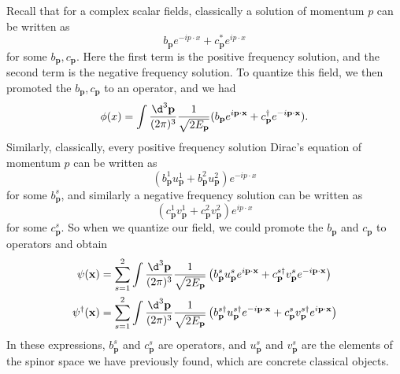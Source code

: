 \documentclass[a4paper]{article}
\begin{document}
Recall that for a complex scalar fields, classically a solution of momentum $p$ can be written as
\[
  b_\mathbf{p} e^{-ip\cdot x} + c_\mathbf{p}^* e^{ip\cdot x}
\]
for some $b_\mathbf{p}, c_\mathbf{p}$. Here the first term is the positive frequency solution, and the second term is the negative frequency solution. To quantize this field, we then promoted the $b_\mathbf{p}, c_\mathbf{p}$ to an operator, and we had
\[
  \phi(x) = \int \frac{\d^3 \mathbf{p}}{(2\pi)^3} \frac{1}{\sqrt{2E_\mathbf{p}}} (b_\mathbf{p} e^{i\mathbf{p}\cdot \mathbf{x}} + c_\mathbf{p}^\dagger e^{-i\mathbf{p}\cdot \mathbf{x}}).
\]
Similarly, classically, every positive frequency solution Dirac's equation of momentum $p$ can be written as
\[
  (b_\mathbf{p}^1 u_\mathbf{p}^1 + b_\mathbf{p}^2 u_\mathbf{p}^2)e^{-ip\cdot x}
\]
for some $b_\mathbf{p}^s$, and similarly a negative frequency solution can be written as
\[
  (c_\mathbf{p}^1 v_\mathbf{p}^1 + c_\mathbf{p}^2 v_\mathbf{p}^2) e^{ip\cdot x}
\]
for some $c_\mathbf{p}^s$. So when we quantize our field, we could promote the $b_\mathbf{p}$ and $c_\mathbf{p}$ to operators and obtain
\begin{align*}
  \psi(\mathbf{x}) &= \sum_{s = 1}^2 \int \frac{\d^3 \mathbf{p}}{(2\pi)^3} \frac{1}{\sqrt{2 E_\mathbf{p}}} \left(b_\mathbf{p}^s u_\mathbf{p}^s e^{i\mathbf{p}\cdot \mathbf{x}} + c_\mathbf{p}^{s\dagger}v_\mathbf{p}^s e^{-i\mathbf{p}\cdot \mathbf{x}}\right)\\
  \psi^\dagger (\mathbf{x}) &= \sum_{s = 1}^2 \int \frac{\d^3 \mathbf{p}}{(2\pi)^3} \frac{1}{\sqrt{2 E_\mathbf{p}}} \left(b_\mathbf{p}^{s\dagger} u_\mathbf{p}^{s\dagger} e^{-i\mathbf{p}\cdot \mathbf{x}} + c_\mathbf{p}^{s}v_\mathbf{p}^{s\dagger} e^{i\mathbf{p}\cdot \mathbf{x}}\right)
\end{align*}
In these expressions, $b_\mathbf{p}^s$ and $c_\mathbf{p}^s$ are operators, and $u_\mathbf{p}^s$ and $v_\mathbf{p}^s$ are the elements of the spinor space we have previously found, which are concrete classical objects.
\end{document}
